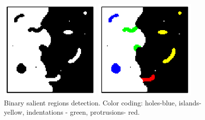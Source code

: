 \documentclass{article}
\begin{document}
\begin{figure}[htb]
\begin{minipage}[b]{.49\linewidth}
  \centering
  \centerline{\includegraphics[width=5cm]{./Figs/binary_marks}}

\end{minipage}
\begin{minipage}[b]{0.49\linewidth}
  \centering
  \centerline{\includegraphics[width=5cm]{./Figs/binary_marks_clean_color_coded}}

\end{minipage}
\vspace{-0.5cm}
\caption{Binary salient regions detection.
Color coding: holes-blue, islands- yellow,
indentations - green, protrusions- red. }
\label{fig:binary_sal}
\end{figure}
\end{document}
